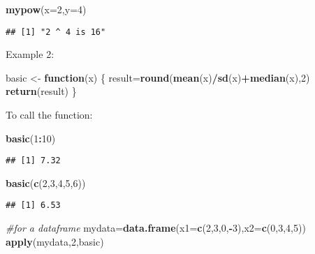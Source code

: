 \documentclass[]{book}
\newenvironment{Shaded}{\begin{snugshade}}{\end{snugshade}}
\newcommand{\KeywordTok}[1]{\textcolor[rgb]{0.13,0.29,0.53}{\textbf{#1}}}
\newcommand{\DataTypeTok}[1]{\textcolor[rgb]{0.13,0.29,0.53}{#1}}
\newcommand{\DecValTok}[1]{\textcolor[rgb]{0.00,0.00,0.81}{#1}}
\newcommand{\StringTok}[1]{\textcolor[rgb]{0.31,0.60,0.02}{#1}}
\newcommand{\CommentTok}[1]{\textcolor[rgb]{0.56,0.35,0.01}{\textit{#1}}}
\newcommand{\ControlFlowTok}[1]{\textcolor[rgb]{0.13,0.29,0.53}{\textbf{#1}}}
\newcommand{\OperatorTok}[1]{\textcolor[rgb]{0.81,0.36,0.00}{\textbf{#1}}}
\newcommand{\NormalTok}[1]{#1}
\theoremstyle{definition}
\theoremstyle{definition}
\theoremstyle{definition}
\theoremstyle{remark}
\begin{document}
\begin{Shaded}
\begin{Highlighting}[]
\KeywordTok{mypow}\NormalTok{(}\DataTypeTok{x=}\DecValTok{2}\NormalTok{,}\DataTypeTok{y=}\DecValTok{4}\NormalTok{)}
\end{Highlighting}
\end{Shaded}

\begin{verbatim}
## [1] "2 ^ 4 is 16"
\end{verbatim}

Example 2:

\begin{Shaded}
\begin{Highlighting}[]
\NormalTok{basic <-}\StringTok{ }\ControlFlowTok{function}\NormalTok{(x) \{}
\NormalTok{  result=}\KeywordTok{round}\NormalTok{(}\KeywordTok{mean}\NormalTok{(x)}\OperatorTok{/}\KeywordTok{sd}\NormalTok{(x)}\OperatorTok{+}\KeywordTok{median}\NormalTok{(x),}\DecValTok{2}\NormalTok{)}
   \KeywordTok{return}\NormalTok{(result)}
\NormalTok{\}}
\end{Highlighting}
\end{Shaded}

To call the function:

\begin{Shaded}
\begin{Highlighting}[]
\KeywordTok{basic}\NormalTok{(}\DecValTok{1}\OperatorTok{:}\DecValTok{10}\NormalTok{)}
\end{Highlighting}
\end{Shaded}

\begin{verbatim}
## [1] 7.32
\end{verbatim}

\begin{Shaded}
\begin{Highlighting}[]
\KeywordTok{basic}\NormalTok{(}\KeywordTok{c}\NormalTok{(}\DecValTok{2}\NormalTok{,}\DecValTok{3}\NormalTok{,}\DecValTok{4}\NormalTok{,}\DecValTok{5}\NormalTok{,}\DecValTok{6}\NormalTok{))}
\end{Highlighting}
\end{Shaded}

\begin{verbatim}
## [1] 6.53
\end{verbatim}

\begin{Shaded}
\begin{Highlighting}[]
\CommentTok{#for a dataframe}
\NormalTok{mydata=}\KeywordTok{data.frame}\NormalTok{(}\DataTypeTok{x1=}\KeywordTok{c}\NormalTok{(}\DecValTok{2}\NormalTok{,}\DecValTok{3}\NormalTok{,}\DecValTok{0}\NormalTok{,}\OperatorTok{-}\DecValTok{3}\NormalTok{),}\DataTypeTok{x2=}\KeywordTok{c}\NormalTok{(}\DecValTok{0}\NormalTok{,}\DecValTok{3}\NormalTok{,}\DecValTok{4}\NormalTok{,}\DecValTok{5}\NormalTok{))}
\KeywordTok{apply}\NormalTok{(mydata,}\DecValTok{2}\NormalTok{,basic)}
\end{Highlighting}
\end{Shaded}
\end{document}

